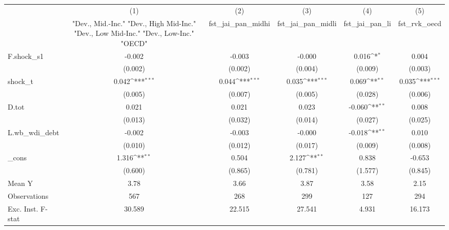{
\def\sym#1{\ifmmode^{#1}\else\(^{#1}\)\fi}
\begin{tabular}{l*{5}{c}}
\toprule
            &\multicolumn{1}{c}{(1)}&\multicolumn{1}{c}{(2)}&\multicolumn{1}{c}{(3)}&\multicolumn{1}{c}{(4)}&\multicolumn{1}{c}{(5)}\\
            &\multicolumn{1}{c}{ "Dev., Mid.-Inc." "Dev., High Mid-Inc." "Dev., Low Mid-Inc." "Dev., Low-Inc." "OECD" }&\multicolumn{1}{c}{fst\_jai\_pan\_midhi}&\multicolumn{1}{c}{fst\_jai\_pan\_midli}&\multicolumn{1}{c}{fst\_jai\_pan\_li}&\multicolumn{1}{c}{fst\_rvk\_oecd}\\
\midrule
F.shock\_s1  &      -0.002         &      -0.003         &      -0.000         &       0.016\sym{*}  &       0.004         \\
            &     (0.002)         &     (0.002)         &     (0.004)         &     (0.009)         &     (0.003)         \\
\addlinespace
shock\_t     &       0.042\sym{***}&       0.044\sym{***}&       0.035\sym{***}&       0.069\sym{**} &       0.035\sym{***}\\
            &     (0.005)         &     (0.007)         &     (0.005)         &     (0.028)         &     (0.006)         \\
\addlinespace
D.tot       &       0.021         &       0.021         &       0.023         &      -0.060\sym{**} &       0.008         \\
            &     (0.013)         &     (0.032)         &     (0.014)         &     (0.027)         &     (0.025)         \\
\addlinespace
L.wb\_wdi\_debt&      -0.002         &      -0.003         &      -0.000         &      -0.018\sym{**} &       0.010         \\
            &     (0.010)         &     (0.012)         &     (0.017)         &     (0.009)         &     (0.008)         \\
\addlinespace
\_cons      &       1.316\sym{**} &       0.504         &       2.127\sym{**} &       0.838         &      -0.653         \\
            &     (0.600)         &     (0.865)         &     (0.781)         &     (1.577)         &     (0.845)         \\
\midrule
Mean Y      &        3.78         &        3.66         &        3.87         &        3.58         &        2.15         \\
Observations&         567         &         268         &         299         &         127         &         294         \\
Exc. Inst. F-stat&      30.589         &      22.515         &      27.541         &       4.931         &      16.173         \\
\bottomrule
\end{tabular}
}
